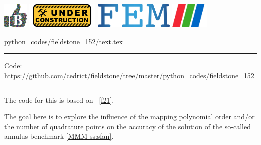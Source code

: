 \noindent
\includegraphics[height=1.25cm]{images/pictograms/benchmark}
\includegraphics[height=1.25cm]{images/pictograms/under_construction}
\includegraphics[height=1.25cm]{images/pictograms/FEM}
\includegraphics[height=1.25cm]{images/pictograms/paraview}



\begin{flushright} {\tiny {\color{gray} python\_codes/fieldstone\_152/text.tex}} \end{flushright}



\par\noindent\rule{\textwidth}{0.4pt}

\begin{center}
\inpython
{\small Code: \url{https://github.com/cedrict/fieldstone/tree/master/python_codes/fieldstone_152}}
\end{center}

\par\noindent\rule{\textwidth}{0.4pt}




The code for this \stone is based on \stone~\ref{f21}. 

The goal here is to explore the influence of the mapping polynomial order and/or
the number of quadrature points on the accuracy of the solution of the so-called 
annulus benchmark \ref{MMM-ss:sfan}.

